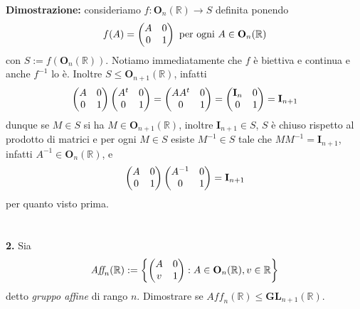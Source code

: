 \documentclass{article}
\begin{document}
\textbf{Dimostrazione:} consideriamo $f : \mathbf{O}_n(\mathbb{R}) \longrightarrow S$ definita ponendo
\begin{gather}
    f(A) = \begin{pmatrix}
        A & 0 \\
        0 & 1
    \end{pmatrix} \text{ per ogni } A \in \mathbf{O}_n(\mathbb{R}) \notag
\end{gather}
con $S := f(\mathbf{O}_n(\mathbb{R}))$. Notiamo immediatamente che $f$ è biettiva e continua e anche $f^{-1}$ lo è. Inoltre $S \leq \mathbf{O}_{n + 1}(\mathbb{R})$, infatti
\begin{gather}
    \begin{pmatrix}
        A & 0 \\
        0 & 1
    \end{pmatrix}
    \begin{pmatrix}
        A^t & 0 \\
        0 & 1
    \end{pmatrix} = 
    \begin{pmatrix}
        AA^t & 0 \\
        0 & 1
    \end{pmatrix} = 
    \begin{pmatrix}
        \mathbf{I}_n & 0 \\
        0 & 1
    \end{pmatrix} = \mathbf{I}_{n + 1} \notag
\end{gather}
dunque se $M \in S$ si ha $M \in \mathbf{O}_{n + 1}(\mathbb{R})$, inoltre $\mathbf{I}_{n + 1} \in S$, $S$ è chiuso rispetto al prodotto di matrici e per ogni $M \in S$ esiste $M^{-1} \in S$ tale che $MM^{-1} = \mathbf{I}_{n + 1}$, infatti $A^{-1} \in \mathbf{O}_n(\mathbb{R})$, e
\begin{gather}
    \begin{pmatrix}
        A & 0 \\
        0 & 1
    \end{pmatrix}
    \begin{pmatrix}
        A^{-1} & 0 \\
        0 & 1
    \end{pmatrix} = 
    \mathbf{I}_{n + 1} \notag
\end{gather}
per quanto visto prima. \\ \\ \\
\textbf{2.} Sia
\begin{gather}
    \textit{Aff}_n(\mathbb{R}) := \left\{ \begin{pmatrix}
        A & 0 \\
        v & 1
    \end{pmatrix} : A \in \mathbf{O}_n(\mathbb{R}), v \in \mathbb{R} \right\} \notag
\end{gather}
detto \textit{gruppo affine} di rango $n$. Dimostrare se $\textit{Aff}_n(\mathbb{R}) \leq \mathbf{GL}_{n + 1}(\mathbb{R})$. \\
\end{document}

